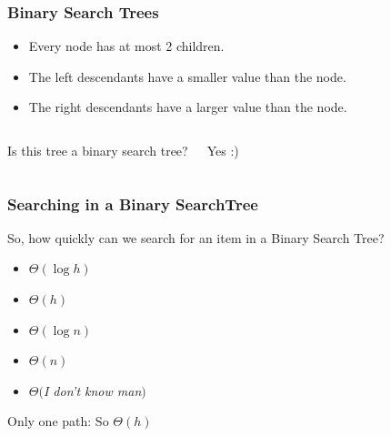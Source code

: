 \begin{frame}
	\frametitle{Binary Search Trees}
	
		\begin{itemize}
			\item Every node has at most 2 children.
				
			\item The left descendants have a smaller value than the node.
			\item The right descendants have a larger value than the node.
		\end{itemize}
	
	\begin{columns}[T]


			Is this tree a binary search tree?
		
			Yes :)	
	\end{columns}
\end{frame}

\begin{frame}
	\frametitle{Searching in a Binary SearchTree}
	
			So, how quickly can we search for an item in a Binary Search Tree?
			\begin{itemize}
				\item $\Theta(\log h)$
				\item $\Theta(h)$
				\item $\Theta(\log n)$
				\item $\Theta(n)$
				\item $\Theta($\textit{I don't know man}$)$
			\end{itemize}
		
		Only one path:	So $\Theta(h)$

		
		

\end{frame}

